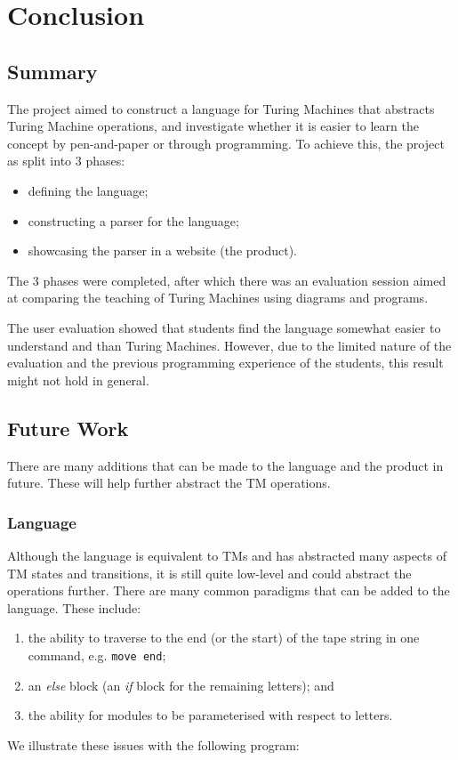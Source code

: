 \chapter{Conclusion}

\section{Summary}
The project aimed to construct a language for Turing Machines that abstracts Turing Machine operations, and investigate whether it is easier to learn the concept by pen-and-paper or through programming. To achieve this, the project as split into 3 phases:
\begin{itemize}
    \item defining the language;
    \item constructing a parser for the language;
    \item showcasing the parser in a website (the product).
\end{itemize}
The 3 phases were completed, after which there was an evaluation session aimed at comparing the teaching of Turing Machines using diagrams and programs.

The user evaluation showed that students find the language somewhat easier to understand and than Turing Machines. However, due to the limited nature of the evaluation and the previous programming experience of the students, this result might not hold in general.

\section{Future Work}

There are many additions that can be made to the language and the product in future. These will help further abstract the TM operations.

\subsection{Language}
Although the language is equivalent to TMs and has abstracted many aspects of TM states and transitions, it is still quite low-level and could abstract the operations further. There are many common paradigms that can be added to the language. These include:
\begin{enumerate}
    \item the ability to traverse to the end (or the start) of the tape string in one command, e.g. \texttt{move end}; 
    \item an \textit{else} block (an \textit{if} block for the remaining letters); and
    \item the ability for modules to be parameterised with respect to letters.
\end{enumerate}
We illustrate these issues with the following program:



